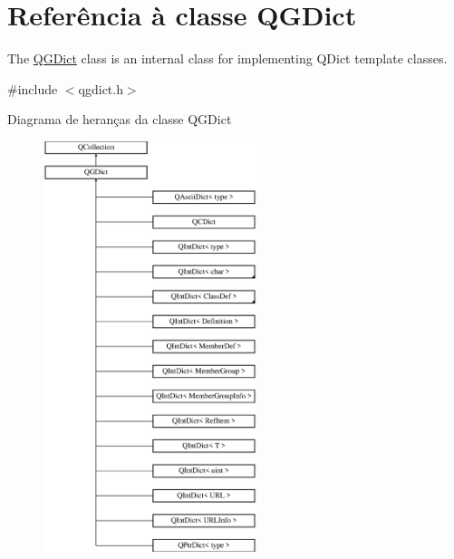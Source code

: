 \hypertarget{class_q_g_dict}{\section{Referência à classe Q\-G\-Dict}
\label{class_q_g_dict}
}


The \hyperlink{class_q_g_dict}{Q\-G\-Dict} class is an internal class for implementing Q\-Dict template classes.  




{\ttfamily \#include $<$qgdict.\-h$>$}

Diagrama de heranças da classe Q\-G\-Dict\begin{figure}[H]
\begin{center}
\leavevmode
\includegraphics[height=12.000000cm]{class_q_g_dict}
\end{center}
\end{figure}
